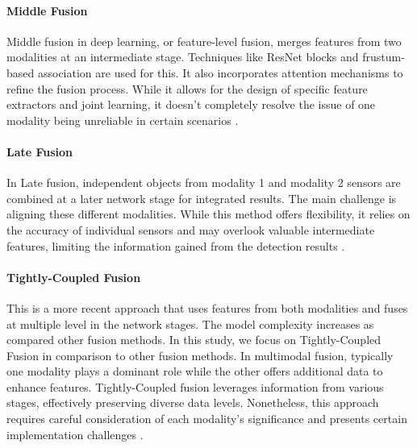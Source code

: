 \documentclass[report.tex]{subfiles}
\begin{document}
    \paragraph*{Middle Fusion}

    Middle fusion in deep learning, or feature-level fusion, merges features from two modalities at an intermediate stage. Techniques like ResNet blocks and frustum-based association are used for this. It also incorporates attention mechanisms to refine the fusion process. While it allows for the design of specific feature extractors and joint learning, it doesn't completely resolve the issue of one modality being unreliable in certain scenarios \cite{yao2023radar}.

    \paragraph*{Late Fusion}

    In Late fusion, independent objects from modality 1 and modality 2 sensors are combined at a later network stage for integrated results. The main challenge is aligning these different modalities. While this method offers flexibility, it relies on the accuracy of individual sensors and may overlook valuable intermediate features, limiting the information gained from the detection results \cite{yao2023radar}.

    \paragraph*{Tightly-Coupled Fusion}

    This is a more recent approach that uses features from both modalities and fuses at multiple level in the network stages. The model complexity increases as compared other fusion methods. In this study, we focus on Tightly-Coupled Fusion in comparison to other fusion methods. In multimodal fusion, typically one modality plays a dominant role while the other offers additional data to enhance features. Tightly-Coupled fusion leverages information from various stages, effectively preserving diverse data levels. Nonetheless, this approach requires careful consideration of each modality's significance and presents certain implementation challenges \cite{yao2023radar}.



    
    
\end{document}
